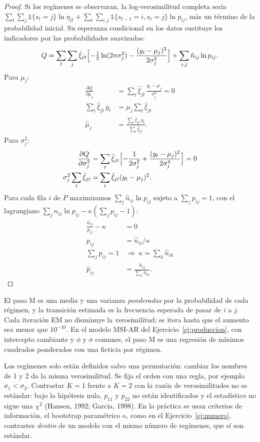 \begin{proof}
Si los regímenes se observaran, la log-verosimilitud completa sería
$\sum_t\sum_j\mathbb 1\{s_t=j\}\ln\eta_{jt}+\sum_t\sum_{i,j}\mathbb 1\{s_{t-1}=i,s_t=j\}\ln p_{ij}$, más un término de la
probabilidad inicial. Su esperanza condicional en los datos sustituye los indicadores por las probabilidades suavizadas:
\[
  Q=\sum_t\sum_j\hat\xi_{jt}\Bigl[-\tfrac12\ln(2\pi\sigma_j^2)-\frac{(y_t-\mu_j)^2}{2\sigma_j^2}\Bigr]+\sum_{i,j}\hat n_{ij}\ln p_{ij}.
\]
Para $\mu_j$:
\begin{align*}
  \frac{\partial Q}{\partial\mu_j} &= \sum_t\hat\xi_{jt}\,\frac{y_t-\mu_j}{\sigma_j^2}=0\\
  \sum_t\hat\xi_{jt}\,y_t &= \mu_j\sum_t\hat\xi_{jt}\\
  \hat\mu_j &= \frac{\sum_t\hat\xi_{jt}\,y_t}{\sum_t\hat\xi_{jt}}.
\end{align*}
Para $\sigma_j^2$:
\begin{align*}
  \frac{\partial Q}{\partial\sigma_j^2} &= \sum_t\hat\xi_{jt}\Bigl[-\frac{1}{2\sigma_j^2}+\frac{(y_t-\mu_j)^2}{2\sigma_j^4}\Bigr]=0\\
  \sigma_j^2\sum_t\hat\xi_{jt} &= \sum_t\hat\xi_{jt}(y_t-\mu_j)^2 .
\end{align*}
Para cada fila $i$ de $P$ maximizamos $\sum_j\hat n_{ij}\ln p_{ij}$ sujeto a $\sum_jp_{ij}=1$, con el lagrangiano
$\sum_j\hat n_{ij}\ln p_{ij}-\kappa(\sum_jp_{ij}-1)$:
\begin{align*}
  \frac{\hat n_{ij}}{p_{ij}}-\kappa &= 0\\
  p_{ij} &= \hat n_{ij}/\kappa\\
  \sum_jp_{ij}=1 &\ \Rightarrow\ \kappa=\sum_k\hat n_{ik}\\
  \hat p_{ij} &= \frac{\hat n_{ij}}{\sum_k\hat n_{ik}} .
\end{align*}
\end{proof}

El paso M es una media y una varianza \emph{ponderadas} por la probabilidad de cada régimen, y la transición estimada es
la frecuencia esperada de pasar de $i$ a $j$. Cada iteración EM no disminuye la verosimilitud; se itera hasta que el
aumento sea menor que $10^{-10}$. En el modelo MSI-AR del Ejercicio~\ref{ej:produccion}, con intercepto cambiante y
$\phi$ y $\sigma$ comunes, el paso M es una regresión de mínimos cuadrados ponderados con una ficticia por régimen.

\begin{observacion}
Los regímenes solo están definidos salvo una permutación: cambiar los nombres de 1 y 2 da la misma verosimilitud. Se
fija el orden con una regla, por ejemplo $\sigma_1<\sigma_2$. Contrastar $K=1$ frente a $K=2$ con la razón de
verosimilitudes no es estándar: bajo la hipótesis nula, $p_{11}$ y $p_{22}$ no están identificados y el estadístico no
sigue una $\chi^2$ (Hansen, 1992; Garcia, 1998). En la práctica se usan criterios de información, el bootstrap
paramétrico o, como en el Ejercicio~\ref{ej:numero}, contrastes \emph{dentro} de un modelo con el mismo número de regímenes,
que sí son estándar.
\end{observacion}


